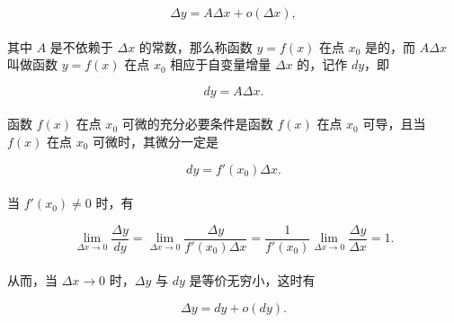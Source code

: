 \begin{equation}
\Delta y = A\Delta x + o(\Delta x),
\end{equation}

\paragraph{}
其中 $A$ 是不依赖于 $\Delta x$ 的常数，那么称函数 $y = f(x)$ 在点 $x_0$ 是的，而 $A\Delta x$ 叫做函数 $y = f(x)$ 在点 $x_0$ 相应于自变量增量 $\Delta x$ 的，记作 $dy$，即

\begin{equation}
dy = A\Delta x.
\end{equation}

\paragraph{}
函数 $f(x)$ 在点 $x_0$ 可微的充分必要条件是函数 $f(x)$ 在点 $x_0$ 可导，且当 $f(x)$ 在点 $x_0$ 可微时，其微分一定是

\begin{equation}
dy = f'(x_0)\Delta x.
\end{equation}

\paragraph{}
当 $f'(x_0) \neq 0$ 时，有

\begin{equation}
\lim_{\Delta x \to 0} \frac{\Delta y}{dy} = \lim_{\Delta x \to 0} \frac{\Delta y}{f'(x_0) \Delta x} = \frac{1}{f'(x_0)}\lim_{\Delta x \to 0}\frac{\Delta y}{\Delta x} = 1.
\end{equation}

\paragraph{}
从而，当 $\Delta x \to 0$ 时，$\Delta y$ 与 $dy$ 是等价无穷小，这时有

\begin{equation}
\Delta y = dy + o(dy).
\end{equation}
